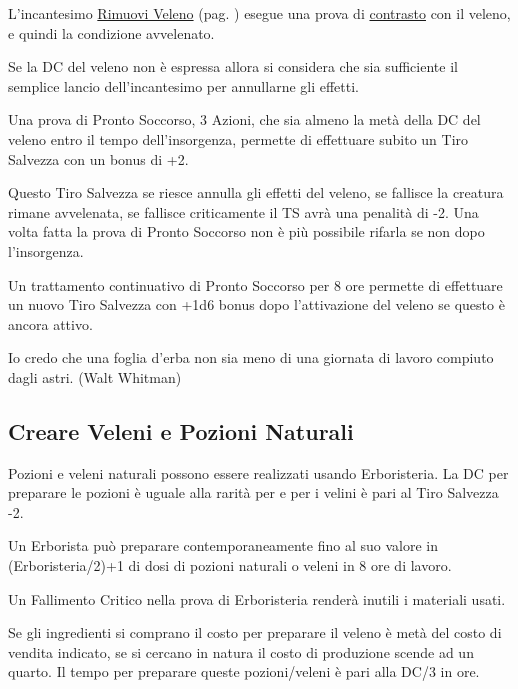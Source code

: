 \begin{multicols}{2}
L'incantesimo \hyperlink{incrimuoviveleno}{Rimuovi Veleno} (pag. \pageref{incrimuoviveleno}) esegue una prova di \hyperlink{contrastareincantesimi}{contrasto} con il veleno, e quindi la condizione avvelenato.

Se la DC del veleno non è espressa allora si considera che sia sufficiente il semplice lancio dell'incantesimo per annullarne gli effetti.

Una prova di Pronto Soccorso, 3 Azioni, che sia almeno la metà della DC del veleno entro il tempo dell'insorgenza, permette di effettuare subito un Tiro Salvezza con un bonus di +2.

Questo Tiro Salvezza se riesce annulla gli effetti del veleno, se fallisce la creatura rimane avvelenata, se fallisce criticamente il TS avrà una penalità di -2.
Una volta fatta la prova di Pronto Soccorso non è più possibile rifarla se non dopo l'insorgenza.

Un trattamento continuativo di Pronto Soccorso per 8 ore permette di effettuare un nuovo Tiro Salvezza con +1d6 bonus dopo l'attivazione del veleno se questo è ancora attivo.

\medskip

\begin{changemargin}{0.3cm}{0.3cm}\begin{enfasi}{
Io credo che una foglia d'erba non sia meno di una giornata di lavoro compiuto dagli astri. (Walt Whitman)}
\end{enfasi}\end{changemargin}

\subsection{Creare Veleni e Pozioni Naturali}\label{crearevelenonaturale}

Pozioni e veleni naturali possono essere realizzati usando Erboristeria. La DC per preparare le pozioni è uguale alla rarità per e per i velini è pari al Tiro Salvezza -2.

Un Erborista può preparare contemporaneamente fino al suo valore in (Erboristeria/2)+1 di dosi di pozioni naturali o veleni in 8 ore di lavoro.

Un Fallimento Critico nella prova di Erboristeria renderà inutili i materiali usati.

Se gli ingredienti si comprano il costo per preparare il veleno è metà del costo di vendita indicato, se si cercano in natura il costo di produzione scende ad un quarto. Il tempo per preparare queste pozioni/veleni è pari alla DC/3 in ore.


\end{multicols}
